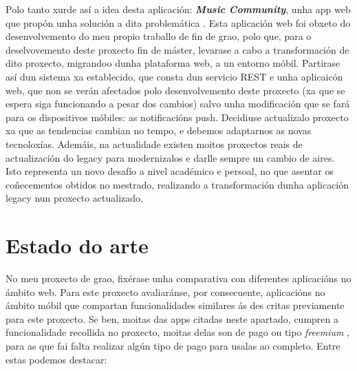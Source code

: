 Polo tanto xurde así a idea desta aplicación: \textbf{\textit{Music Community}}, unha app web que propón unha solución a dita problemática \cite{TFGLuis}. Esta aplicación  web foi obxeto do desenvolvemento do meu propio traballo de fin de grao, polo que, para o deselvovemento deste proxecto fin de máster, levarase a cabo a transformación de dito proxecto, migrandoo dunha plataforma web, a un entorno móbil.  Partirase así dun sistema xa establecido, que consta dun servicio REST e unha aplicaicón web, que non se verán afectados polo desenvolvemento deste proxecto (xa que se espera siga funcionando a pesar dos cambios) salvo unha modificación que se fará para os dispositivos móbiles: as notificacións push. Decidiuse actualizalo proxecto xa que as tendencias cambian no tempo, e debemos adaptarnos as novas tecnoloxías. Ademáis, na actualidade existen moitos proxectos reais de actualización do legacy para modernizalos e darlle sempre un cambio de aires. Isto representa un novo desafío a nivel académico e persoal, no que asentar os coñecementos obtidos no mestrado, realizando a transformación dunha aplicación legacy nun proxecto actualizado.

\section{Estado do arte}
\label{sec:estado-arte}

No meu proxecto de grao, fixérase unha comparativa con diferentes aplicacións no ámbito web. Para este proxecto avaliaránse, por consecuente, aplicacións no ámbito móbil que compartan funcionalidades similares ás des critas previamente para este proxecto. Se ben, moitas das apps citadas neste apartado, cumpren a funcionalidade recollida no proxecto, moitas delas son de pago ou tipo \textit{freemium} , para as que fai falta realizar algún tipo de pago para usalas ao completo. Entre estas podemos destacar:

